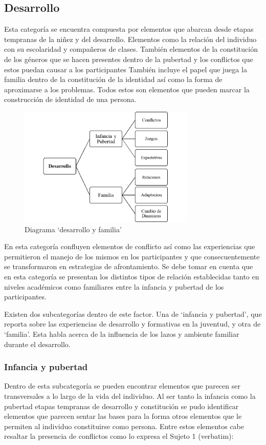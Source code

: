 \subsection{Desarrollo}
Esta categoría se encuentra compuesta por elementos que abarcan desde etapas
tempranas de la niñez y del desarrollo.
Elementos como la relación del individuo con su escolaridad y compañeros de
clases.
También elementos de la constitución de los géneros que se hacen presentes
dentro de la pubertad y los conflictos que estos puedan causar a los
participantes
También incluye el papel que juega la familia dentro de la constitución de la
identidad así como la forma de aproximarse a los problemas.
Todos estos son elementos que pueden marcar la construcción de identidad de una
persona.

\begin{figure}
    \centering
    \includegraphics[width=0.75\textwidth]{desarrollo}
    \caption{Diagrama ‘desarrollo y familia’}\label{fig:desarrollo}
\end{figure}

En esta categoría confluyen elementos de conflicto así como las experiencias que
permitieron el manejo de los mismos en los participantes y que
consecuentemente se transformaron en estrategias de afrontamiento. Se debe tomar
en cuenta que en esta categoría se presentan los distintos tipos de relación
establecidas tanto en niveles académicos como familiares entre la infancia y
pubertad de los participantes.

Existen dos subcategorías dentro de este factor. Una de ‘infancia y pubertad’,
que reporta sobre las experiencias de desarrollo y formativas en la juventud, y
otra de ‘familia’. Esta habla acerca de la influencia de los lazos y ambiente
familiar durante el desarrollo.

\subsubsection{Infancia y pubertad}
Dentro de esta subcategoría se pueden
encontrar elementos que parecen ser transversales a lo largo de la vida del
individuo. Al ser tanto la infancia como la pubertad etapas tempranas de
desarrollo y constitución se pudo identificar elementos que parecen sentar las
bases para la forma otros elementos que le permiten al individuo constituirse
como persona. Entre estos elementos cabe resaltar la presencia de conflictos
como lo expresa el Sujeto 1 (verbatim):

